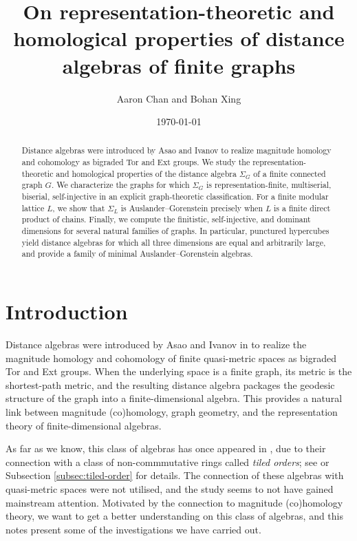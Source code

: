 \documentclass[a4paper,leqno]{amsart}
\title[On distance algebras of finite graphs]{On representation-theoretic and homological properties of distance algebras of finite graphs}
\author{Aaron Chan and Bohan Xing}
\date{\today}
\begin{document}
\begin{abstract}
Distance algebras were introduced by Asao and Ivanov to realize magnitude homology and cohomology as bigraded Tor and Ext groups.  We study the representation-theoretic and homological properties of the distance algebra $\Sigma_G$ of a finite connected graph $G$.  We characterize the graphs for which $\Sigma_G$ is representation-finite, multiserial, biserial, self-injective in an explicit graph-theoretic classification.  For a finite modular lattice $L$, we show that $\Sigma_L$ is Auslander--Gorenstein precisely when $L$ is a finite direct product of chains.  Finally, we compute the finitistic, self-injective, and dominant dimensions for several natural families of graphs.  In particular, punctured hypercubes yield distance algebras for which all three dimensions are equal and arbitrarily large, and provide a family of minimal Auslander--Gorenstein algebras.
\end{abstract}


\maketitle

\tableofcontents

\section{Introduction}

Distance algebras were introduced by Asao and Ivanov in \cite{AI24} to realize the magnitude homology and cohomology of finite quasi-metric spaces as bigraded Tor and Ext groups.  When the underlying space is a finite graph, its metric is the shortest-path metric, and the resulting distance algebra packages the geodesic structure of the graph into a finite-dimensional algebra.  This provides a natural link between magnitude (co)homology, graph geometry, and the representation theory of finite-dimensional algebras.  

As far as we know, this class of algebras has once appeared in \cite{GHZ98}, due to their connection with a class of non-commmutative rings called \emph{tiled orders}; see \cite{GHZ98,IL26}  or Subsection \ref{subsec:tiled-order} for details.
The connection of these algebras with quasi-metric spaces were not utilised, and the study seems to not have gained mainstream attention.  
Motivated by the connection to magnitude (co)homology theory, we want to get a better understanding on this class of algebras, and this notes present some of the investigations we have carried out. 
\end{document}
